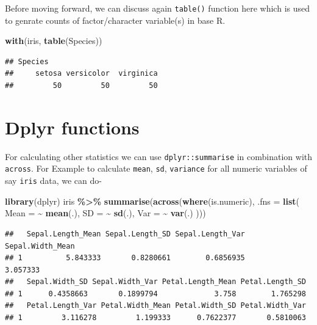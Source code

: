 \documentclass[
]{book}
\newenvironment{Shaded}{\begin{snugshade}}{\end{snugshade}}
\newcommand{\AttributeTok}[1]{\textcolor[rgb]{0.13,0.29,0.53}{#1}}
\newcommand{\FunctionTok}[1]{\textcolor[rgb]{0.13,0.29,0.53}{\textbf{#1}}}
\newcommand{\NormalTok}[1]{#1}
\newcommand{\SpecialCharTok}[1]{\textcolor[rgb]{0.81,0.36,0.00}{\textbf{#1}}}
\begin{document}
Before moving forward, we can discuss again \texttt{table()} function here which is used to genrate counts of factor/character variable(s) in base R.

\begin{Shaded}
\begin{Highlighting}[]
\FunctionTok{with}\NormalTok{(iris, }\FunctionTok{table}\NormalTok{(Species))}
\end{Highlighting}
\end{Shaded}

\begin{verbatim}
## Species
##     setosa versicolor  virginica 
##         50         50         50
\end{verbatim}

\hypertarget{dplyr-functions}{%
\section{Dplyr functions}\label{dplyr-functions}}

For calculating other statistics we can use \texttt{dplyr::summarise} in combination with \texttt{across}. For Example to calculate \texttt{mean}, \texttt{sd}, \texttt{variance} for all numeric variables of say \texttt{iris} data, we can do-

\begin{Shaded}
\begin{Highlighting}[]
\FunctionTok{library}\NormalTok{(dplyr)}
\NormalTok{iris }\SpecialCharTok{\%\textgreater{}\%}
  \FunctionTok{summarise}\NormalTok{(}\FunctionTok{across}\NormalTok{(}\FunctionTok{where}\NormalTok{(is.numeric),}
                   \AttributeTok{.fns =} \FunctionTok{list}\NormalTok{(}
                     \AttributeTok{Mean =} \SpecialCharTok{\textasciitilde{}} \FunctionTok{mean}\NormalTok{(.),}
                     \AttributeTok{SD =} \SpecialCharTok{\textasciitilde{}} \FunctionTok{sd}\NormalTok{(.),}
                     \AttributeTok{Var =} \SpecialCharTok{\textasciitilde{}} \FunctionTok{var}\NormalTok{(.)}
\NormalTok{                   )))}
\end{Highlighting}
\end{Shaded}

\begin{verbatim}
##   Sepal.Length_Mean Sepal.Length_SD Sepal.Length_Var Sepal.Width_Mean
## 1          5.843333       0.8280661        0.6856935         3.057333
##   Sepal.Width_SD Sepal.Width_Var Petal.Length_Mean Petal.Length_SD
## 1      0.4358663       0.1899794             3.758        1.765298
##   Petal.Length_Var Petal.Width_Mean Petal.Width_SD Petal.Width_Var
## 1         3.116278         1.199333      0.7622377       0.5810063
\end{verbatim}
\end{document}
